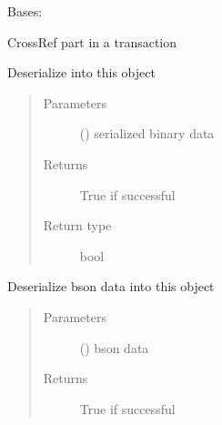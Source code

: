 \documentclass[letterpaper,10pt,english]{sphinxmanual}
\begin{document}
\begin{fulllineitems}
\label{\detokenize{bbc1.core.bbclib:bbc1.core.bbclib.BBcCrossRef}}
Bases: 

CrossRef part in a transaction

\begin{fulllineitems}
\label{\detokenize{bbc1.core.bbclib:bbc1.core.bbclib.BBcCrossRef.deserialize}}
Deserialize into this object
\begin{quote}\begin{description}
\item[{Parameters}] \leavevmode
{} () \textendash{} serialized binary data

\item[{Returns}] \leavevmode
True if successful

\item[{Return type}] \leavevmode
bool

\end{description}\end{quote}

\end{fulllineitems}


\begin{fulllineitems}
\label{\detokenize{bbc1.core.bbclib:bbc1.core.bbclib.BBcCrossRef.deserialize_bson}}
Deserialize bson data into this object
\begin{quote}\begin{description}
\item[{Parameters}] \leavevmode
{} () \textendash{} bson data

\item[{Returns}] \leavevmode
True if successful


\end{description}
\end{quote}
\end{fulllineitems}
\end{fulllineitems}
\end{document}

